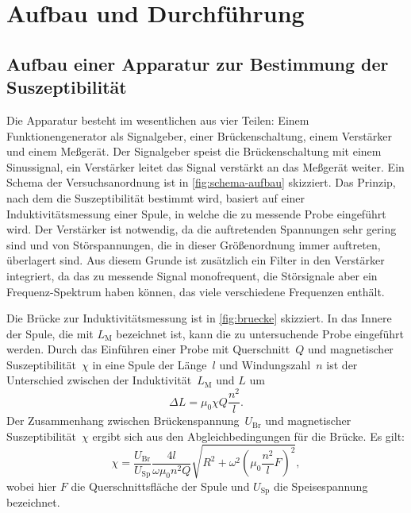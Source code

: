 
\section{Aufbau und Durchführung}

\subsection{Aufbau einer Apparatur zur Bestimmung der Suszeptibilität}
\label{sec:aufbau-apparatur}

Die Apparatur besteht im wesentlichen aus vier Teilen: Einem
Funktionengenerator als Signalgeber, einer Brückenschaltung, einem
Verstärker und einem Meßgerät.  Der Signalgeber speist die
Brückenschaltung mit einem Sinussignal, ein Verstärker leitet das Signal
verstärkt an das Meßgerät weiter.  Ein Schema der Versuchsanordnung ist
in \cref{fig:schema-aufbau} skizziert.  Das Prinzip, nach dem die
Suszeptibilität bestimmt wird, basiert auf einer Induktivitätsmessung
einer Spule, in welche die zu messende Probe eingeführt wird.  Der
Verstärker ist notwendig, da die auftretenden Spannungen sehr gering
sind und von Störspannungen, die in dieser Größenordnung immer
auftreten, überlagert sind.  Aus diesem Grunde ist zusätzlich ein Filter
in den Verstärker integriert, da das zu messende Signal monofrequent,
die Störsignale aber ein Frequenz-Spektrum haben können, das viele
verschiedene Frequenzen enthält.

Die Brücke zur Induktivitätsmessung ist in \cref{fig:bruecke}
skizziert.  In das Innere der Spule, die mit $L_\text{M}$ bezeichnet ist,
kann die zu untersuchende Probe eingeführt werden.  Durch das Einführen
einer Probe mit Querschnitt~$Q$ und magnetischer Suszeptibilität~$\chi$
in eine Spule der Länge~$l$ und Windungszahl~$n$ ist der Unterschied
zwischen der Induktivität~$L_\text{M}$ und $L$ um
\begin{equation}
  \Delta L = \mu_0 \chi Q \frac{n^2}{l}.
\end{equation}
Der Zusammenhang zwischen Brückenspannung~$U_\text{Br}$ und magnetischer
Suszeptibilität~$\chi$ ergibt sich aus den Abgleichbedingungen für die
Brücke.  Es gilt:
\begin{equation}
  \label{eq:chi-spannungen}
  \chi = \frac{U_\text{Br}}{U_\text{Sp}} \frac{4 l}{\omega \mu_0 n^2 Q}
  \sqrt{R^2 + \omega^2 \left(\mu_0 \frac{n^2}{l} F\right)^2},
\end{equation}
wobei hier $F$ die Querschnittsfläche der Spule und $U_\text{Sp}$ die
Speisespannung bezeichnet.


